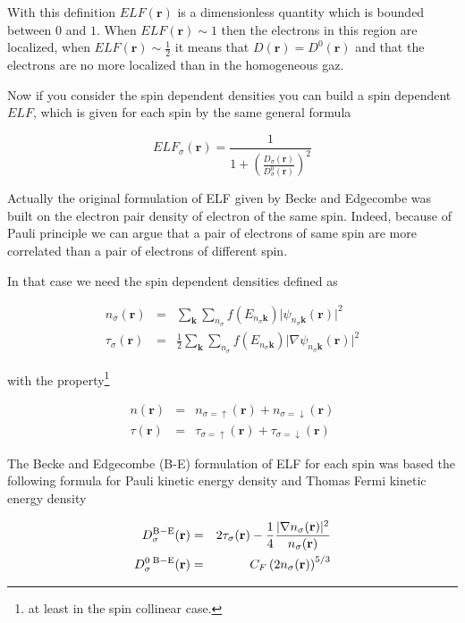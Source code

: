 \documentclass[a4paper,12pt]{report}
\begin{document}
With this definition $ELF(\mathbf{r})$ is a dimensionless quantity which is bounded between $0$ and $1$. When $ELF(\mathbf{r})\sim1$ then the electrons in this region are localized, when $ELF(\mathbf{r})\sim\frac{1}{2}$ it means that $D(\mathbf{r})=D^{0}(\mathbf{r})$ and that the electrons are no more localized than in the homogeneous gaz.

Now if you consider the spin dependent densities you can build a spin dependent $ELF$, which is given for each spin by the same general formula

\begin{equation}
ELF_{\sigma}(\mathbf{r}) = \frac{1}{1+\left( \frac{D_{\sigma}(\mathbf{r})}{D_{\sigma}^{0}(\mathbf{r})}\right)^2 }
\end{equation}

Actually the original formulation of ELF given by Becke and Edgecombe was built on the electron pair density of electron of the same spin. Indeed, because of Pauli principle we can argue that a pair of electrons of same spin are more correlated than a pair of electrons of different spin.

In that case we need the spin dependent densities defined as

\begin{eqnarray}
n_{\sigma}(\mathbf{r}) &=& \sum_{\mathbf{k}} \sum_{n_{\sigma}} f(E_{n_{\sigma}\mathbf{k}}) \vert \psi_{n_{\sigma}\mathbf{k}}(\mathbf{r}) \vert^2 \\
\tau_{\sigma}(\mathbf{r}) &=& \frac{1}{2} \sum_{\mathbf{k}} \sum_{n_{\sigma}} f(E_{n_{\sigma}\mathbf{k}}) \vert \nabla \psi_{n_{\sigma}\mathbf{k}}(\mathbf{r}) \vert^2
\end{eqnarray}

with the property\footnote{at least in the spin collinear case.}

\begin{eqnarray}
n(\mathbf{r}) &=& n_{\sigma=\uparrow}(\mathbf{r}) + n_{\sigma=\downarrow}(\mathbf{r})\\
\tau(\mathbf{r}) &=& \tau_{\sigma=\uparrow}(\mathbf{r}) + \tau_{\sigma=\downarrow}(\mathbf{r})
\end{eqnarray}

The Becke and Edgecombe (B-E) formulation of ELF for each spin was based the following formula for Pauli kinetic energy density and Thomas Fermi kinetic energy density

\begin{eqnarray}
D_{\sigma}^{\rm{B-E}}(\mathbf{r}) &=& 2\tau_{\sigma}(\mathbf{r}) - \frac{1}{4} \frac{\vert \nabla n_{\sigma}(\mathbf{r}) \vert^2}{n_{\sigma}(\mathbf{r})}\\
D_{\sigma}^{0\;\rm{B-E}}(\mathbf{r}) &=& C_F \left(2 n_{\sigma}(\mathbf{r})\right)^{5/3}
\end{eqnarray}
\end{document}
